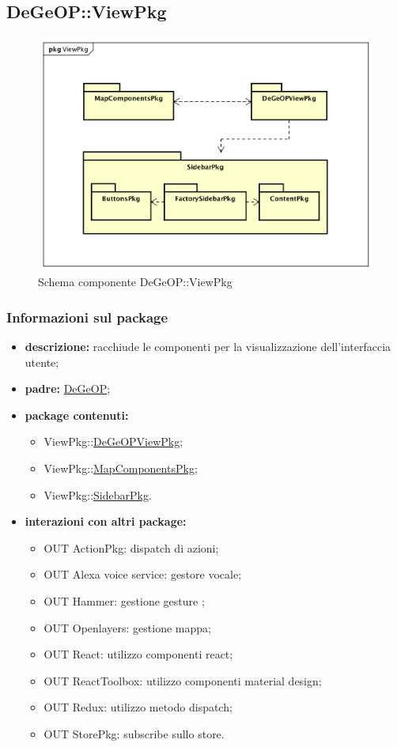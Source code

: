 \subsection{DeGeOP::ViewPkg}
\label{pkg::ViewPkg}
\begin{figure}[H]
	\centering
	\includegraphics[width=\textwidth]{img/PkgDiagram/STViewPkg.png}
	\caption{Schema componente DeGeOP::ViewPkg}
\end{figure}
\subsubsection{Informazioni sul package}
\begin{itemize}
	\item \textbf{descrizione:} racchiude le componenti per la visualizzazione dell'interfaccia utente;
	\item \textbf{padre:} \hyperref[pkg::DeGeOP]{DeGeOP};
	\item \textbf{package contenuti:}
	\begin{itemize}
		\item ViewPkg::\hyperref[pkg::DeGeOPViewPkg]{DeGeOPViewPkg};
		\item ViewPkg::\hyperref[pkg::MapComponentsPkg]{MapComponentsPkg};
		\item ViewPkg::\hyperref[pkg::SidebarPkg]{SidebarPkg}.
	\end{itemize}
	\item \textbf{interazioni con altri package:} 
	\begin{itemize}
		\item OUT ActionPkg: dispatch di azioni;
		\item OUT Alexa voice service: gestore vocale;
		\item OUT Hammer: gestione gesture ;
		\item OUT Openlayers: gestione mappa;
		\item OUT React: utilizzo componenti react;
		\item OUT ReactToolbox: utilizzo componenti material design;
		\item OUT Redux: utilizzo metodo dispatch;
		\item OUT StorePkg: subscribe sullo store.
	\end{itemize}
\end{itemize}
\newpage
